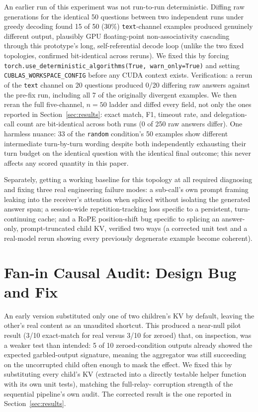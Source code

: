 \documentclass[11pt]{article}
\begin{document}
An earlier run of this experiment was not run-to-run deterministic.
Diffing raw generations for the identical 50 questions between two
independent runs under greedy decoding found 15 of 50 (30\%)
\texttt{text}-channel examples produced genuinely different output,
plausibly GPU floating-point non-associativity cascading through this
prototype's long, self-referential decode loop (unlike the two fixed
topologies, confirmed bit-identical across reruns). We fixed this by
forcing \texttt{torch.use\_deterministic\_algorithms(True,
warn\_only=True)} and setting \texttt{CUBLAS\_WORKSPACE\_CONFIG} before
any CUDA context exists. Verification: a rerun of the \texttt{text}
channel on 20 questions produced 0/20 differing raw answers against the
pre-fix run, including all 7 of the originally divergent examples. We
then reran the full five-channel, $n=50$ ladder and diffed every field,
not only the ones reported in Section~\ref{sec:results}: exact match,
F1, timeout rate, and delegation-call count are bit-identical across
both runs (0 of 250 raw answers differ). One harmless nuance: 33 of the
\texttt{random} condition's 50 examples show different intermediate
turn-by-turn wording despite both independently exhausting their turn
budget on the identical question with the identical final outcome; this
never affects any scored quantity in this paper.

Separately, getting a working baseline for this topology at all
required diagnosing and fixing three real engineering failure modes: a
sub-call's own prompt framing leaking into the receiver's attention
when spliced without isolating the generated answer span; a
session-wide repetition-tracking loss specific to a persistent,
turn-continuing cache; and a RoPE position-shift bug specific to
splicing an answer-only, prompt-truncated child KV, verified two ways
(a corrected unit test and a real-model rerun showing every previously
degenerate example become coherent).

\section{Fan-in Causal Audit: Design Bug and Fix}
\label{app:faninbug}

An early version substituted only one of two children's KV by default,
leaving the other's real content as an unaudited shortcut. This
produced a near-null pilot result (3/10 exact-match for real versus
3/10 for zeroed) that, on inspection, was a weaker test than intended:
5 of 10 zeroed-condition outputs already showed the expected
garbled-output signature, meaning the aggregator was still succeeding
on the uncorrupted child often enough to mask the effect. We fixed this
by substituting every child's KV (extracted into a directly testable
helper function with its own unit tests), matching the full-relay-
corruption strength of the sequential pipeline's own audit. The
corrected result is the one reported in Section~\ref{sec:results}.
\end{document}
